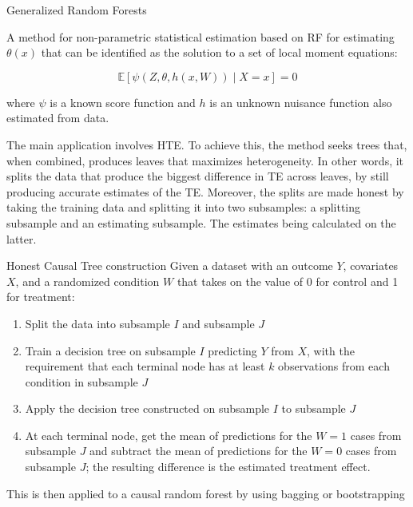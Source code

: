 \documentclass[9pt]{beamer}
\begin{document}
\begin{frame}[label = GRF]{Generalized Random Forests}

A method for non-parametric statistical estimation based on RF
for estimating $\theta(x)$ that can be identified as the solution to a set of local moment equations:

\[\mathbb{E}[\psi(Z,\theta,h(x,W))\;|\;X=x]=0\]

where $\psi$ is a known score function and $h$ is an unknown nuisance function also estimated from data.\\

\vspace{5mm}

The main application involves HTE. To achieve this, the method seeks trees that, when combined, produces leaves that maximizes heterogeneity. In other words, it splits the data that produce the biggest difference in TE across leaves, by still producing accurate estimates of the TE. Moreover, the splits are made honest by taking the training data and splitting it into two subsamples: a splitting subsample and an estimating subsample. The estimates being calculated on the latter. \hyperlink{hte}{}\\

\end{frame}



\begin{frame}{Honest Causal Tree construction}
Given a dataset with an outcome $Y$, covariates $X$, and a randomized condition $W$ that takes on the value of 0 for control and 1 for treatment:

\begin{enumerate}
\item Split the data into subsample $I$ and subsample $J$

\item Train a decision tree on subsample $I$ predicting $Y$ from $X$, with the requirement that each terminal node has at least $k$ observations from each condition in subsample $J$

\item Apply the decision tree constructed on subsample $I$ to subsample $J$

\item At each terminal node, get the mean of predictions for the $W = 1$ cases from subsample $J$ and subtract the mean of predictions for the $W = 0$ cases from subsample $J$; the resulting difference is the estimated treatment effect.

\end{enumerate}

This is then applied to a causal random forest by using bagging or bootstrapping

\end{frame}
\end{document}
